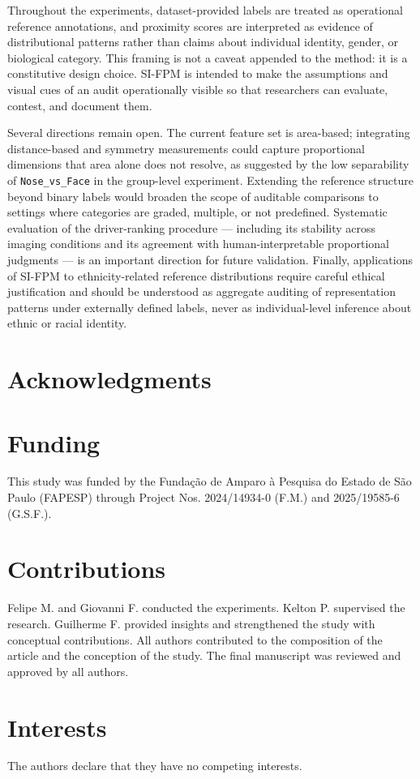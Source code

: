 \documentclass{article}
\begin{document}
Throughout the experiments, dataset-provided labels are treated as operational reference annotations, and proximity scores are interpreted as evidence of distributional patterns rather than claims about individual identity, gender, or biological category. This framing is not a caveat appended to the method: it is a constitutive design choice. SI-FPM is intended to make the assumptions and visual cues of an audit operationally visible so that researchers can evaluate, contest, and document them.

Several directions remain open. The current feature set is area-based; integrating distance-based and symmetry measurements could capture proportional dimensions that area alone does not resolve, as suggested by the low separability of \texttt{Nose\_vs\_Face} in the group-level experiment. Extending the reference structure beyond binary labels would broaden the scope of auditable comparisons to settings where categories are graded, multiple, or not predefined. Systematic evaluation of the driver-ranking procedure — including its stability across imaging conditions and its agreement with human-interpretable proportional judgments — is an important direction for future validation. Finally, applications of SI-FPM to ethnicity-related reference distributions require careful ethical justification and should be understood as aggregate auditing of representation patterns under externally defined labels, never as individual-level inference about ethnic or racial identity.


\section*{Acknowledgments}


\section*{Funding}
This study was funded by the Funda\c{c}\~ao de Amparo \`a Pesquisa do Estado de S\~ao Paulo (FAPESP) through Project Nos. 2024/14934-0 (F.M.) and 2025/19585-6 (G.S.F.).


\section*{Contributions}
Felipe M. and Giovanni F. conducted the experiments. Kelton P. supervised the research. Guilherme F. provided insights and strengthened the study with conceptual contributions. All authors contributed to the composition of the article and the conception of the study. The final manuscript was reviewed and approved by all authors.

\section*{Interests}
The authors declare that they have no competing interests.


\end{document}

